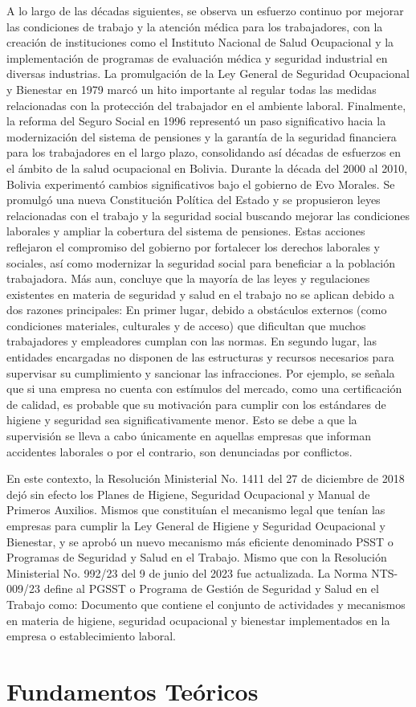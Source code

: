 A lo largo de las décadas siguientes, se observa un esfuerzo continuo por mejorar las condiciones de trabajo y la atención médica para los trabajadores, con la creación de instituciones como el Instituto Nacional de Salud Ocupacional y la implementación de programas de evaluación médica y seguridad industrial en diversas industrias.
La promulgación de la Ley General de Seguridad Ocupacional y Bienestar en 1979 marcó un hito importante al regular todas las medidas relacionadas con la protección del trabajador en el ambiente laboral.
Finalmente, la reforma del Seguro Social en 1996 representó un paso significativo hacia la modernización del sistema de pensiones y la garantía de la seguridad financiera para los trabajadores en el largo plazo, consolidando así décadas de esfuerzos en el ámbito de la salud ocupacional en Bolivia.
Durante la década del 2000 al 2010, Bolivia experimentó cambios significativos bajo el gobierno de Evo Morales. Se promulgó una nueva Constitución Política del Estado y se propusieron leyes relacionadas con el trabajo y la seguridad social buscando mejorar las condiciones laborales y ampliar la cobertura del sistema de pensiones. Estas acciones reflejaron el compromiso del gobierno por fortalecer los derechos laborales y sociales, así como modernizar la seguridad social para beneficiar a la población trabajadora.
Más aun, \textcite{cervantesdiagnostico} concluye que la mayoría de las leyes y regulaciones existentes en materia de seguridad y salud en el trabajo no se aplican debido a dos razones principales: En primer lugar, debido a obstáculos externos (como condiciones materiales, culturales y de acceso) que dificultan que muchos trabajadores y empleadores cumplan con las normas. En segundo lugar, las entidades encargadas no disponen de las estructuras y recursos necesarios para supervisar su cumplimiento y sancionar las infracciones. Por ejemplo, se señala que si una empresa no cuenta con estímulos del mercado, como una certificación de calidad, es probable que su motivación para cumplir con los estándares de higiene y seguridad sea significativamente menor. Esto se debe a que la supervisión se lleva a cabo únicamente en aquellas empresas que informan accidentes laborales o por el contrario, son denunciadas por conflictos.  

En este contexto, la Resolución Ministerial No. 1411 del 27 de diciembre de 2018 dejó sin efecto los Planes de Higiene, Seguridad Ocupacional y Manual de Primeros Auxilios. Mismos que constituían el mecanismo legal que tenían las empresas para cumplir la Ley General de Higiene y Seguridad Ocupacional y Bienestar, y se aprobó un nuevo mecanismo más eficiente denominado PSST o Programas de Seguridad y Salud en el Trabajo.
Mismo que con la Resolución Ministerial No. 992/23 del 9 de junio del 2023 fue actualizada. La Norma NTS-009/23 define al PGSST o Programa de Gestión de Seguridad y Salud en el Trabajo como: Documento que contiene el conjunto de actividades y mecanismos en materia de higiene, seguridad ocupacional y bienestar implementados en la empresa o establecimiento laboral.
\section{Fundamentos Teóricos}


